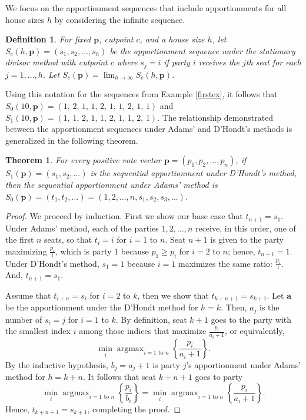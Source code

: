 \documentclass[pdflatex,sn-mathphys-num]{sn-jnl}
\DeclareMathOperator*{\argmax}{argmax}
\theoremstyle{thmstyleone}%
\newtheorem{theorem}{Theorem}%
\theoremstyle{thmstyletwo}%
\theoremstyle{thmstylethree}%
\newtheorem{definition}{Definition}%
\begin{document}
We focus on the apportionment sequences that include apportionments for all house sizes $h$ by considering the infinite sequence.

\begin{definition}  For  fixed  $\mathbf p$, cutpoint $c$,  and a house size $h$, let $S_c(h, \mathbf p) = (s_1, s_2, \dots, s_h)$ be the apportionment sequence under the stationary divisor method with cutpoint $c$ where  $s_j =i$ if party $i$  receives the $j$th seat for each $j =1, \ldots, h$.  Let $S_c( \mathbf p) = \lim_{h \rightarrow \infty} S_c( h, \mathbf p)$.   \end{definition}

Using this notation for the sequences from Example \ref{firstex}, it follows that $S_0(10, \mathbf p) =  (1, \,2, \,1, \, 1, \, 2, \, 1, \, 1, \, 2, \, 1, \, 1)$ and $S_1(10, \mathbf p) =(1, \, 1, \, 2, \, 1, \, 1, \, 2, \, 1, \, 1, \, 2, \, 1)$.  The relationship demonstrated between the apportionment sequences under Adams' and D'Hondt's methods is generalized in the following theorem.

\begin{theorem}\label{jeff_adams}
For every positive vote vector $\mathbf p = (p_1, p_2, \ldots, p_n)$, if $S_1(\mathbf p) = (s_1, s_2, \dots)$ is the sequential apportionment under D'Hondt's method, then the sequential apportionment under Adams' method is $S_0(\mathbf p) = (t_1, t_2, \dots) = (1, 2, \dots, n, s_1, s_2, s_3, \dots)$.  \end{theorem}

\begin{proof} 
We proceed by induction. First we show our base case that $t_{n+1} = s_1$.  Under Adams' method, each of the parties $1, 2,  \dots, n$ receive, in this order, one of the first $n$ seats, so that $t_i = i$ for $i = 1$ to $n$. Seat $n+1$ is given to the party maximizing $\frac{p_i}{1}$, which is party 1 because $p_1 \ge p_i$ for $i=2$ to $n$; hence, $t_{n+1} = 1$. Under D'Hondt's method, $s_1 = 1$ because $i=1$ maximizes the same ratio: $\frac{p_i}{1}$. And, $t_{n+1} = s_1$.

Assume that $t_{i+n} = s_i$ for $i = 2$ to $k$, then we show that $t_{k+n+1} = s_{k+1}$. Let $\mathbf a$ be the apportionment under the D'Hondt method for $h=k$. Then, $a_j$ is the number of $s_i = j$ for $i = 1$ to $k$.  By definition, seat $k+1$ goes to the party with the smallest index $i$ among those indices that maximize $\frac{p_i}{a_i+1}$, or equivalently,
\begin{equation*}
\min_i \argmax_{i = 1 \text{ to }n} \left\{ \frac{p_i}{a_i + 1} \right\}.
\end{equation*}
By the inductive hypothesis, $b_j = a_j + 1$ is party $j$'s apportionment under Adams' method for $h = k+n$. It follows that seat $k+n+1$ goes to party 
\begin{equation*}
\min_i \argmax_{i = 1 \text{ to }n} \left\{ \frac{p_i}{b_i} \right\} = \min_i \argmax_{i = 1 \text{ to }n} \left\{ \frac{p_i}{a_i + 1} \right\}.
\end{equation*}
Hence, $t_{k+n+1} = s_{k+1}$, completing the proof.
\end{proof}
\end{document}
